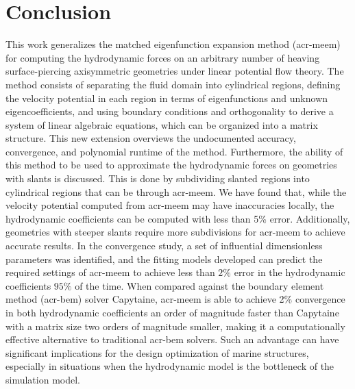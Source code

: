 \documentclass[ASNA,twocolumn]{USG} %
\begin{document}
\section{Conclusion}\label{jfm:sec:conclusion}
This work generalizes the matched eigenfunction expansion method (\gls{acr-meem}) for computing the hydrodynamic forces on an arbitrary number of heaving surface-piercing axisymmetric geometries under linear potential flow theory.
The method consists of separating the fluid domain into cylindrical regions, defining the velocity potential in each region in terms of eigenfunctions and unknown eigencoefficients, and using boundary conditions and orthogonality to derive a system of linear algebraic equations, which can be organized into a matrix structure.
This new extension overviews the undocumented accuracy, convergence, and polynomial runtime of the method.
Furthermore, the ability of this method to be used to approximate the hydrodynamic forces on geometries with slants is discussed.
This is done by subdividing slanted regions into cylindrical regions that can be \modelled{} through \gls{acr-meem}. We have found that, while the velocity potential computed from \gls{acr-meem} may have inaccuracies locally, the hydrodynamic coefficients can be computed with less than 5\% error.
Additionally, geometries with steeper slants require more subdivisions for \gls{acr-meem} to achieve accurate results.
In the convergence study, a set of influential dimensionless parameters was identified, and the fitting models developed can predict the required settings of \gls{acr-meem} to achieve less than $2\%$ error in the hydrodynamic coefficients $95\%$ of the time.
When compared against the boundary element method (\gls{acr-bem}) solver Capytaine, \gls{acr-meem} is able to achieve 2\% convergence in both hydrodynamic coefficients an order of magnitude faster than Capytaine with a matrix size two orders of magnitude smaller, making it a computationally effective alternative to traditional \gls{acr-bem} solvers.
Such an advantage can have significant implications for the design optimization of marine structures, especially in situations when the hydrodynamic model is the bottleneck of the simulation model. 
\end{document}

